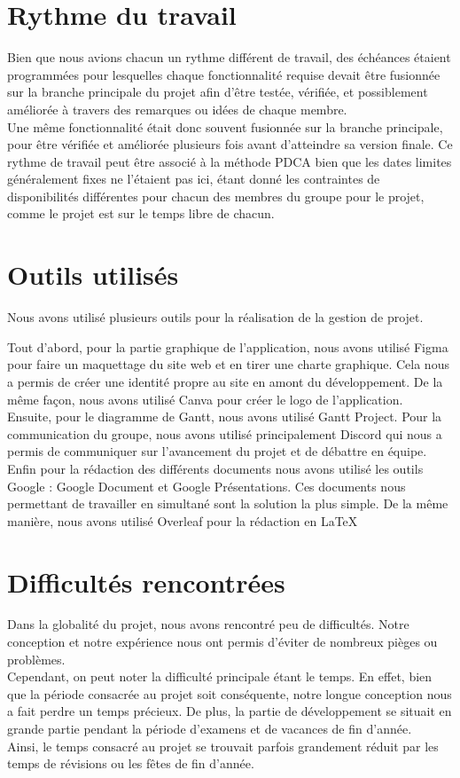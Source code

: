 \documentclass[12pt,titlepage]{report}
\begin{document}
\section{Rythme du travail}
Bien que nous avions chacun un rythme différent de travail, des échéances étaient programmées pour lesquelles chaque fonctionnalité requise devait être fusionnée sur la branche principale du projet afin d’être testée, vérifiée, et possiblement améliorée à travers des remarques ou idées de chaque membre. \\

Une même fonctionnalité était donc souvent fusionnée sur la branche principale, pour être vérifiée et améliorée plusieurs fois avant d’atteindre sa version finale. 
Ce rythme de travail peut être associé à la méthode PDCA bien que les dates limites généralement fixes ne l’étaient pas ici, étant donné les contraintes de disponibilités différentes pour chacun des membres du groupe pour le projet, comme le projet est sur le temps libre de chacun.

\section{Outils utilisés}
Nous avons utilisé plusieurs outils pour la réalisation de la gestion de projet.

Tout d’abord, pour la partie graphique de l’application, nous avons utilisé Figma pour faire un maquettage du site web et en tirer une charte graphique. Cela nous a permis de créer une identité propre au site en amont du développement. De la même façon, nous avons utilisé Canva pour créer le logo de l’application. \\
Ensuite, pour le diagramme de Gantt, nous avons utilisé Gantt Project. 
Pour la communication du groupe, nous avons utilisé principalement Discord qui nous a permis de communiquer sur l’avancement du projet et de débattre en équipe. \\
Enfin pour la rédaction des différents documents nous avons utilisé les outils Google : Google Document et Google Présentations. Ces documents nous permettant de travailler en simultané sont la solution la plus simple. De la même manière, nous avons utilisé Overleaf pour la rédaction en LaTeX

\section{Difficultés rencontrées}

Dans la globalité du projet, nous avons rencontré peu de difficultés. Notre conception et notre expérience nous ont permis d’éviter de nombreux pièges ou problèmes. \\Cependant, on peut noter la difficulté principale étant le temps. En effet, bien que la période consacrée au projet soit conséquente, notre longue conception nous a fait perdre un temps précieux. De plus, la partie de développement se situait en grande partie pendant la période d’examens et de vacances de fin d’année. \\
Ainsi, le temps consacré au projet se trouvait parfois grandement réduit par les temps de révisions ou les fêtes de fin d’année. \\
\end{document}
